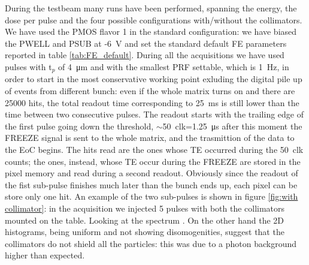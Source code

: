    During the testbeam many runs have been performed, spanning the energy, the dose per pulse and the four possible configurations with/without the collimators. 
   We have used the PMOS flavor 1 in the standard configuration: we have biased the PWELL and PSUB at -\SI{6}{V} and set the standard default FE parameters reported in table \ref{tab:FE_default}.
   During all the acquisitions we have used pulses with t$_p$ of \SI{4}{\um} and with the smallest PRF settable, which is \SI{1}{Hz}, in order to start in the most conservative working point exluding the digital pile up of events from different bunch: even if the whole matrix turns on and there are 25000 hits, the total readout time corresponding to \SI{25}{ms} is still lower than the time between two consecutive pulses.
   The readout starts with the trailing edge of the first pulse going down the threshold, $\sim$\SI{50}{clk}=\SI{1.25}{\us} after this moment the FREEZE signal is sent to the whole matrix, and the trasmittion of the data to the EoC begins.
   The hits read are the ones whose TE occurred during the \SI{50}{clk} counts; the ones, instead, whose TE occur during the FREEZE are stored in the pixel memory and read during a second readout. Obviously since the readout of the fist sub-pulse finishes much later than the bunch ends up, each pixel can be store only one hit.   
   An example of the two sub-pulses is shown in figure \ref{fig:with collimator}: in the acquisition we injected 5 pulses with both the collimators mounted on the table. Looking at the spectrum . On the other hand the 2D histograms, being uniform and not showing disomogenities, suggest that the collimators do not shield all the particles: this was due to a photon background higher than expected. 

